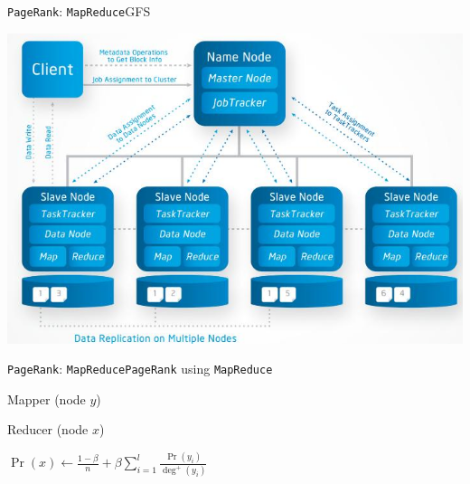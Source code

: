 \documentclass[xcolor=table,final]{beamer} %
\newcommand{\PageRank}{\texttt{PageRank}\xspace}
\newcommand{\MapReduce}{\texttt{MapReduce}\xspace}
\begin{document}
\begin{frame}{\PageRank : \MapReduce}{GFS}
  \begin{center}
    \includegraphics[width=.9\textwidth]{figs/extras/GFS2}
  \end{center}
\end{frame}
\begin{frame}{\PageRank : \MapReduce}{\PageRank using \MapReduce}
  \begin{block}{Mapper (node $y$)}
    \begin{algorithm}[H]

      \BlankLine

    \end{algorithm}    
  \end{block}

  \begin{block}{Reducer (node $x$)}
    \begin{algorithm}[H]

      \BlankLine

      ${\Pr}(x) \gets \frac{1-\beta}{n} + \beta \sum_{i = 1}^{l} \frac{\Pr(y_i)}{\deg^+(y_i)}$
    \end{algorithm}    
  \end{block}
\end{frame}
\end{document}

